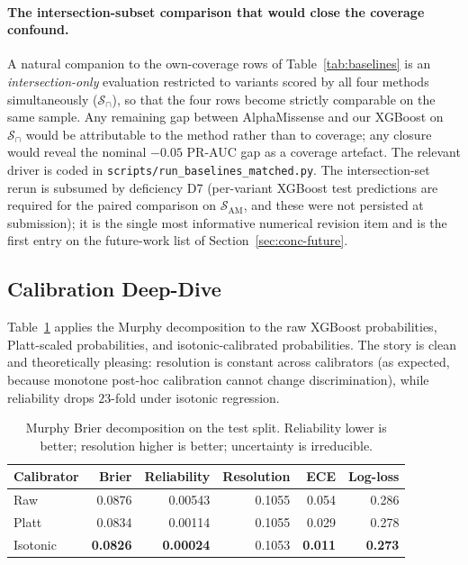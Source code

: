 \documentclass[11pt,a4paper,oneside]{report}
\begin{document}
\paragraph{The intersection-subset comparison that would close
the coverage confound.} A natural companion to the own-coverage
rows of Table~\ref{tab:baselines} is an \emph{intersection-only}
evaluation restricted to variants scored by all four methods
simultaneously ($\mathcal{S}_{\cap}$), so that the four rows
become strictly comparable on the same sample. Any remaining gap
between AlphaMissense and our XGBoost on $\mathcal{S}_{\cap}$
would be attributable to the method rather than to coverage; any
closure would reveal the nominal $-0.05$ PR-AUC gap as a coverage
artefact. The relevant driver is coded in
\texttt{scripts/run\_baselines\_matched.py}. The intersection-set
rerun is subsumed by deficiency D7 (per-variant XGBoost test
predictions are required for the paired comparison on
$\mathcal{S}_{\text{AM}}$, and these were not persisted at
submission); it is the single most informative numerical
revision item and is the first entry on the future-work
list of Section~\ref{sec:conc-future}.

\subsection{Calibration Deep-Dive}
\label{sec:res-calibration}

Table~\ref{tab:brier} applies the Murphy decomposition
to the raw XGBoost probabilities, Platt-scaled
probabilities, and isotonic-calibrated probabilities.
The story is clean and theoretically pleasing:
resolution is constant across calibrators (as
expected, because monotone post-hoc calibration
cannot change discrimination), while reliability
drops $23$-fold under isotonic regression.

\begin{table}[H]
\centering
\caption[Brier decomposition]{Murphy Brier decomposition
on the test split. Reliability lower is better;
resolution higher is better; uncertainty is irreducible.}
\label{tab:brier}
\small
\begin{tabular}{@{} l r r r r r @{}}
\toprule
\textbf{Calibrator} & \textbf{Brier} & \textbf{Reliability} & \textbf{Resolution} & \textbf{ECE} & \textbf{Log-loss} \\
\midrule
Raw      & 0.0876          & 0.00543          & 0.1055          & 0.054          & 0.286 \\
Platt    & 0.0834          & 0.00114          & 0.1055          & 0.029          & 0.278 \\
Isotonic & \textbf{0.0826} & \textbf{0.00024} & 0.1053          & \textbf{0.011} & \textbf{0.273} \\
\bottomrule
\end{tabular}
\end{table}
\end{document}
